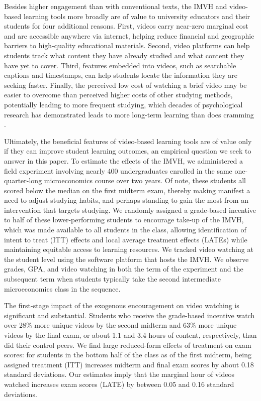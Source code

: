 \documentclass[12pt]{article}
\begin{document}
Besides higher engagement than with conventional texts, the IMVH and video-based learning tools more broadly are of value to university educators and their students for four additional reasons. First, videos carry near-zero marginal cost and are accessible anywhere via internet, helping reduce financial and geographic barriers to high-quality educational materials. Second, video platforms can help students track what content they have already studied and what content they have yet to cover. Third, features embedded into videos, such as searchable captions and timestamps, can help students locate the information they are seeking faster. Finally, the perceived low cost of watching a brief video may be easier to overcome than perceived higher costs of other studying methods, potentially leading to more frequent studying, which decades of psychological research has demonstrated leads to more long-term learning than does cramming \parencite{kornell2009, cpvw2006}.

Ultimately, the beneficial features of video-based learning tools are of value only if they can improve student learning outcomes, an empirical question we seek to answer in this paper. To estimate the effects of the IMVH, we administered a field experiment involving nearly 400 undergraduates enrolled in the same one-quarter-long microeconomics course over two years. Of note, these students all scored below the median on the first midterm exam, thereby making manifest a need to adjust studying habits, and perhaps standing to gain the most from an intervention that targets studying. We randomly assigned a grade-based incentive to half of these lower-performing students to encourage take-up of the IMVH, which was made available to all students in the class, allowing identification of intent to treat (ITT) effects and local average treatment effects (LATEs) while maintaining equitable access to learning resources. We tracked video watching at the student level using the software platform that hosts the IMVH. We observe grades, GPA, and video watching in both the term of the experiment and the subsequent term when students typically take the second intermediate microeconomics class in the sequence.

The first-stage impact of the exogenous encouragement on video watching is significant and substantial. Students who receive the grade-based incentive watch over 28\% more unique videos by the second midterm and 63\% more unique videos by the final exam, or about 1.1 and 3.4 hours of content, respectively, than did their control peers. We find large reduced-form effects of treatment on exam scores: for students in the bottom half of the class as of the first midterm, being assigned treatment (ITT) increases midterm and final exam scores by about 0.18 standard deviations. Our estimates imply that the marginal hour of videos watched increases exam scores (LATE) by between 0.05 and 0.16 standard deviations.
\end{document}
